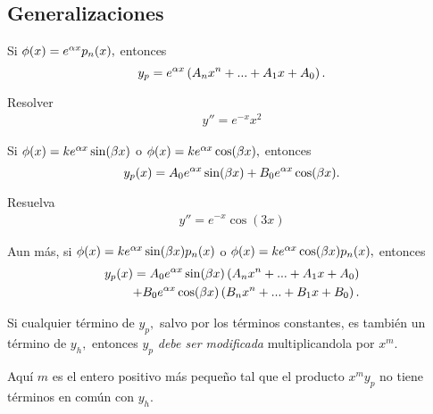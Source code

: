 \subsection{Generalizaciones}


Si $\phi(x)=e^{\alpha x}p_{n}(x),$ entonces
\begin{equation}
	\label{bron:11.4}
	y_{p}=e^{\alpha x}\left( A_{n}x^{n}+...+A_{1}x +A_{0}\right).
\end{equation}



{}
\begin{problema}
	Resolver
	\begin{align*}
		y'' = e^{-x}x^2
	\end{align*}
	
\end{problema}




Si $\phi(x)=ke^{\alpha x}\sin(\beta x)$ o $\phi(x)=ke^{\alpha x}\cos(\beta x),$ entonces
\begin{equation}
	\label{bron:11.5}
	y_{p}(x)=A_{0}e^{\alpha x}\sin(\beta x)+B_{0}e^{\alpha x}\cos(\beta x).
\end{equation}



{}
\begin{problema}
	Resuelva 
	\begin{align*}
		y'' = e^{-x}\cos(3x)
	\end{align*}
	
\end{problema}




Aun más, si $\phi(x)=ke^{\alpha x}\sin(\beta x)p_{n}(x)$ o $\phi(x)=ke^{\alpha x}\cos(\beta x)p_{n}(x),$ entonces
\begin{equation}
	\begin{split}
		\label{bron:11.5}
		y_{p}(x)=A_{0}e^{\alpha x}\sin(\beta x)\left( A_{n}x^{n}+...+A_{1}x +A_{0}\right)\\+B_{0}e^{\alpha x}\cos(\beta x)\left( B_{n}x^{n}+...+B_{1}x +B_{0}\right).
	\end{split}
\end{equation}




\begin{rem}
	Si cualquier t\'ermino de $y_{p},$ salvo por los t\'erminos constantes, es tambi\'en un t\'ermino de $y_{h},$ entonces $y_{p}$ \emph{debe ser modificada} multiplicandola por $x^{m}.$
	
	
	Aqu\'i $m$ es el entero positivo más pequeño tal que el producto $x^{m}y_{p}$ no tiene t\'erminos en común con $y_{h}.$
\end{rem}



